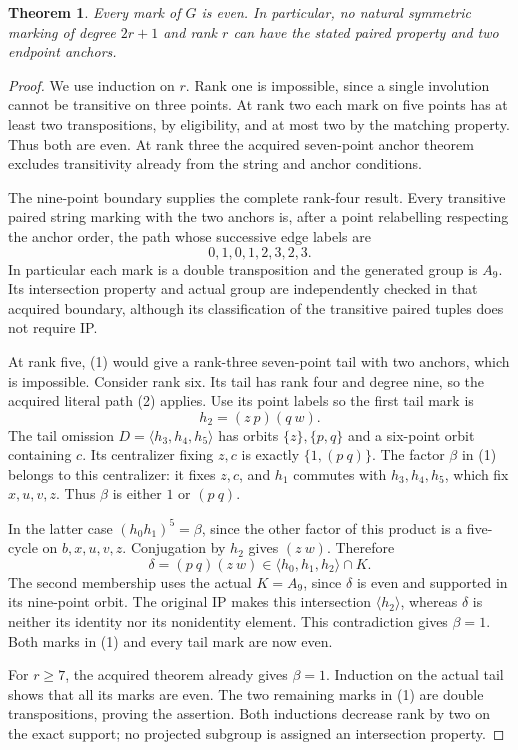\documentclass[11pt,a4paper]{article}
\newtheorem{theorem}{Theorem}
\newcommand{\gen}[1]{\langle#1\rangle}
\begin{document}
\begin{theorem}\label{even}
Every mark of $G$ is even. In particular, no natural symmetric
marking of degree $2r+1$ and rank $r$ can have the stated paired
property and two endpoint anchors.
\end{theorem}
\begin{proof}
We use induction on $r$. Rank one is impossible, since a single
involution cannot be transitive on three points. At rank two each
mark on five points has at least two transpositions, by eligibility,
and at most two by the matching property. Thus both are even.
At rank three the acquired seven-point anchor theorem excludes
transitivity already from the string and anchor conditions.

The nine-point boundary supplies the complete rank-four result.
Every transitive paired string marking with the two anchors is,
after a point relabelling respecting the anchor order, the path
whose successive edge labels are
\[
                         0,1,0,1,2,3,2,3.               \tag{2}
\]
In particular each mark is a double transposition and the generated
group is $A_9$. Its intersection property and actual group are
independently checked in that acquired boundary, although its
classification of the transitive paired tuples does not require IP.

At rank five, (1) would give a rank-three seven-point tail with
two anchors, which is impossible. Consider rank six. Its tail has
rank four and degree nine, so the acquired literal path (2) applies.
Use its point labels so the first tail mark is
\[
 h_2=(z\ p)(q\ w).
\]
The tail omission $D=\gen{h_3,h_4,h_5}$ has orbits
$\{z\},\{p,q\}$ and a six-point orbit containing $c$.
Its centralizer fixing $z,c$ is exactly $\{1,(p\ q)\}$.
The factor $\beta$ in (1) belongs to this centralizer: it fixes
$z,c$, and $h_1$ commutes with $h_3,h_4,h_5$, which fix
$x,u,v,z$. Thus $\beta$ is either $1$ or $(p\ q)$.

In the latter case $(h_0h_1)^5=\beta$, since the other factor
of this product is a five-cycle on $b,x,u,v,z$. Conjugation
by $h_2$ gives $(z\ w)$. Therefore
\[
 \delta=(p\ q)(z\ w)\in\gen{h_0,h_1,h_2}\cap K.
\]
The second membership uses the actual $K=A_9$, since $\delta$
is even and supported in its nine-point orbit. The original IP
makes this intersection $\gen{h_2}$, whereas $\delta$ is
neither its identity nor its nonidentity element. This contradiction
gives $\beta=1$. Both marks in (1) and every tail mark are now even.

For $r\ge7$, the acquired theorem already gives $\beta=1$.
Induction on the actual tail shows that all its marks are even.
The two remaining marks in (1) are double transpositions, proving
the assertion. Both inductions decrease rank by two on the exact
support; no projected subgroup is assigned an intersection property.
\end{proof}
\end{document}
